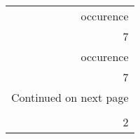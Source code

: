 \begin{longtable}{r}
\toprule
 occurence \\
         7 \\
\midrule
\endfirsthead

\toprule
 occurence \\
         7 \\
\midrule
\endhead
\midrule
\multicolumn{1}{r}{{Continued on next page}} \\
\midrule
\endfoot

\bottomrule
\endlastfoot
         8 \\
         2 \\
\end{longtable}
